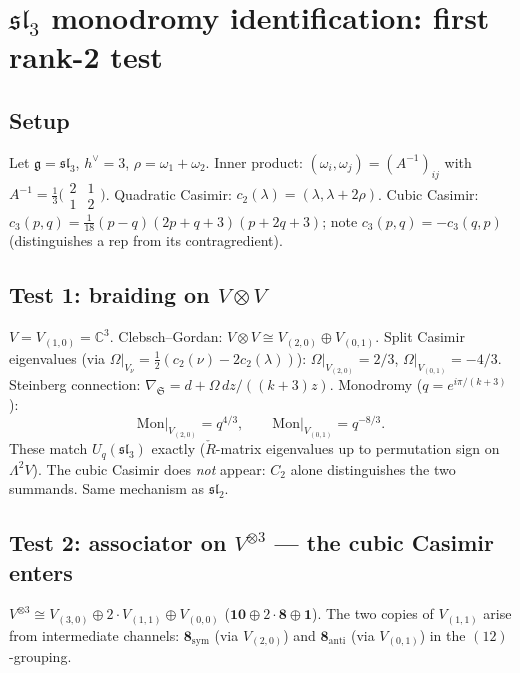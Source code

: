 \documentclass[11pt]{article}
\newcommand{\fg}{\mathfrak{g}}
\newcommand{\fsl}{\mathfrak{sl}}
\newcommand{\C}{\mathbb{C}}
\begin{document}
\section{$\fsl_3$ monodromy identification: first rank-2 test}
\label{sec:sl3-monodromy-extraction}


\subsection*{Setup}
Let $\fg = \fsl_3$, $h^\vee = 3$, $\rho = \omega_1 + \omega_2$.
Inner product: $(\omega_i, \omega_j) = (A^{-1})_{ij}$ with
$A^{-1} = \frac{1}{3}\bigl(\begin{smallmatrix} 2 & 1 \\ 1 & 2
\end{smallmatrix}\bigr)$.
Quadratic Casimir: $c_2(\lambda) = (\lambda, \lambda + 2\rho)$.
Cubic Casimir: $c_3(p,q) = \tfrac{1}{18}(p-q)(2p+q+3)(p+2q+3)$;
note $c_3(p,q) = -c_3(q,p)$ (distinguishes a rep from its contragredient).

\subsection*{Test 1: braiding on $V \otimes V$}
$V = V_{(1,0)} = \C^3$.  Clebsch--Gordan:
$V \otimes V \cong V_{(2,0)} \oplus V_{(0,1)}$.
Split Casimir eigenvalues (via
$\Omega|_{V_\nu} = \tfrac{1}{2}(c_2(\nu) - 2c_2(\lambda))$):
$\Omega|_{V_{(2,0)}} = 2/3$, $\Omega|_{V_{(0,1)}} = -4/3$.
Steinberg connection: $\nabla_{\mathfrak{S}} = d + \Omega\,dz/((k+3)z)$.
Monodromy ($q = e^{i\pi/(k+3)}$):
\[
  \mathrm{Mon}\big|_{V_{(2,0)}} = q^{4/3},
  \qquad
  \mathrm{Mon}\big|_{V_{(0,1)}} = q^{-8/3}.
\]
These match $U_q(\fsl_3)$ exactly ($\check{R}$-matrix eigenvalues
up to permutation sign on $\Lambda^2 V$).
The cubic Casimir does \emph{not} appear: $C_2$ alone distinguishes
the two summands.  Same mechanism as $\fsl_2$.

\subsection*{Test 2: associator on $V^{\otimes 3}$ --- the cubic Casimir enters}
$V^{\otimes 3} \cong V_{(3,0)} \oplus 2 \cdot V_{(1,1)}
\oplus V_{(0,0)}$ ($\mathbf{10} \oplus 2\cdot\mathbf{8} \oplus \mathbf{1}$).
The two copies of $V_{(1,1)}$ arise from intermediate channels:
$\mathbf{8}_{\mathrm{sym}}$ (via $V_{(2,0)}$) and
$\mathbf{8}_{\mathrm{anti}}$ (via $V_{(0,1)}$) in the $(12)$-grouping.
\end{document}
